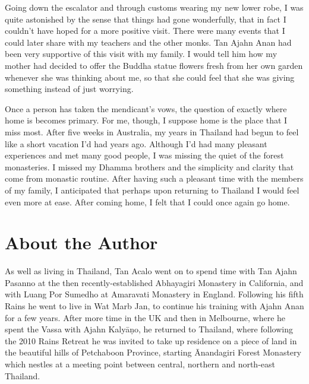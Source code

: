 Going down the escalator and through customs wearing my new lower robe, 
I was quite astonished by the sense that things had gone wonderfully, 
that in fact I couldn't have hoped for a more positive visit. There were
many events that I could later share with my teachers and the other
monks. Tan Ajahn Anan had been very supportive of this visit with my
family. I would tell him how my mother had decided to offer the Buddha
statue flowers fresh from her own garden whenever she was thinking about
me, so that she could feel that she was giving something instead of just
worrying. 

Once a person has taken the mendicant's vows, the question of exactly
where home is becomes primary. For me, though, I suppose home is the
place that I miss most. After five weeks in Australia, my years in
Thailand had begun to feel like a short vacation I'd had years ago. 
Although I'd had many pleasant experiences and met many good people, I
was missing the quiet of the forest monasteries. I missed my Dhamma
brothers and the simplicity and clarity that come from monastic routine. 
After having such a pleasant time with the members of my family, I
anticipated that perhaps upon returning to Thailand I would feel even
more at ease. After coming home, I felt that I could once again go home. 

\dividerRule

\section{About the Author}

As well as living in Thailand, Tan Acalo went on to spend time
with Tan Ajahn Pasanno at the then recently-established Abhayagiri
Monastery in California, and with Luang Por Sumedho at Amaravati
Monastery in England. Following his fifth Rains he went to live in Wat
Marb Jan, to continue his training with Ajahn Anan for a few years. 
After more time in the UK and then in Melbourne, where he spent the
Vassa with Ajahn Kalyāṇo, he returned to Thailand, where following the
2010 Rains Retreat he was invited to take up residence on a piece of
land in the beautiful hills of Petchaboon Province, starting Ānandagiri
Forest Monastery which nestles at a meeting point between central, 
northern and north-east Thailand.

